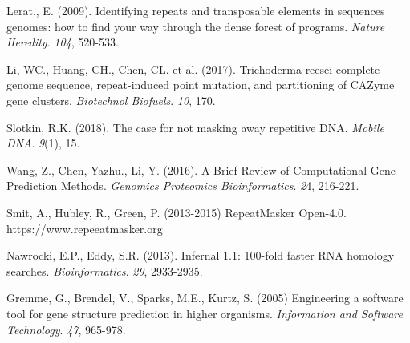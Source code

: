 \documentclass[12pt]{article}
\begin{document}
\begin{thebibliography}{99}
 Lerat., E. (2009). Identifying repeats and
  transposable elements in sequences genomes: how to find your way
  through the dense forest of programs. \textit{Nature
    Heredity}. \textit{104}, 520-533.

 Li, WC., Huang, CH., Chen, CL. et
  al. (2017). Trichoderma reesei complete genome sequence,
  repeat-induced point mutation, and partitioning of CAZyme gene
  clusters. \textit{Biotechnol Biofuels}. \textit{10}, 170.

 Slotkin, R.K. (2018). The case for not masking away
  repetitive DNA. \textit{Mobile DNA}. \textit{9}(1), 15.
  
 Wang, Z., Chen, Yazhu., Li, Y. (2016). A Brief
  Review of Computational Gene Prediction Methods. \textit{Genomics
    Proteomics Bioinformatics}. \textit{2}4, 216-221.

 Smit, A., Hubley, R., Green, P. (2013-2015)
  RepeatMasker Open-4.0. https://www.repeeatmasker.org

 Nawrocki, E.P., Eddy, S.R. (2013). Infernal 1.1:
  100-fold faster RNA homology
  searches. \textit{Bioinformatics}. \textit{29}, 2933-2935.

 Gremme, G., Brendel, V., Sparks, M.E., Kurtz,
  S. (2005) Engineering a software tool for gene structure prediction
  in higher organisms. \textit{Information and Software
    Technology}. \textit{47}, 965-978.
  
\end{thebibliography}
\end{document}
